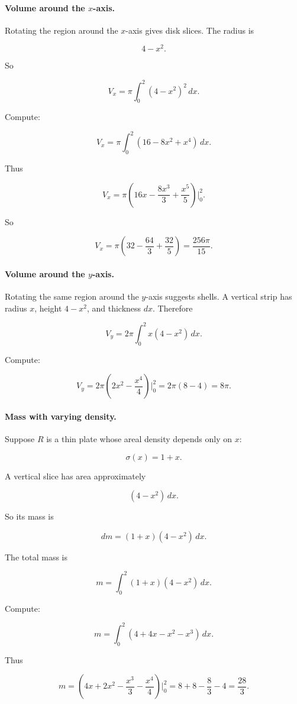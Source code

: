 \paragraph{Volume around the \(x\)-axis.}
Rotating the region around the \(x\)-axis gives disk slices.  The radius is

\[
4-x^2.
\]

So

\[
V_x=\pi\int_0^2 (4-x^2)^2\,dx.
\]

Compute:

\[
V_x
=
\pi\int_0^2 (16-8x^2+x^4)\,dx.
\]

Thus

\[
V_x
=
\pi\left(16x-\frac{8x^3}{3}+\frac{x^5}{5}\right)\Big|_0^2.
\]

So

\[
V_x
=
\pi\left(32-\frac{64}{3}+\frac{32}{5}\right)
=
\boxed{\frac{256\pi}{15}}.
\]

\paragraph{Volume around the \(y\)-axis.}
Rotating the same region around the \(y\)-axis suggests shells.  A vertical strip has
radius \(x\), height \(4-x^2\), and thickness \(dx\).  Therefore

\[
V_y=2\pi\int_0^2 x(4-x^2)\,dx.
\]

Compute:

\[
V_y
=
2\pi\left(2x^2-\frac{x^4}{4}\right)\Big|_0^2
=
2\pi(8-4)
=
\boxed{8\pi}.
\]

\paragraph{Mass with varying density.}
Suppose \(R\) is a thin plate whose areal density depends only on \(x\):

\[
\sigma(x)=1+x.
\]

A vertical slice has area approximately

\[
(4-x^2)\,dx.
\]

So its mass is

\[
dm=(1+x)(4-x^2)\,dx.
\]

The total mass is

\[
m=\int_0^2 (1+x)(4-x^2)\,dx.
\]

Compute:

\[
m=\int_0^2 (4+4x-x^2-x^3)\,dx.
\]

Thus

\[
m=
\left(4x+2x^2-\frac{x^3}{3}-\frac{x^4}{4}\right)\Big|_0^2
=
8+8-\frac83-4
=
\boxed{\frac{28}{3}}.
\]

